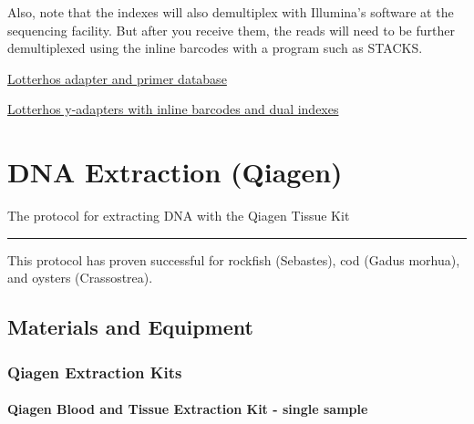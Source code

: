 \documentclass[
  letterpaper,
  DIV=11,
  numbers=noendperiod]{scrreprt}
\begin{document}
Also, note that the indexes will also demultiplex with Illumina's
software at the sequencing facility. But after you receive them, the
reads will need to be further demultiplexed using the inline barcodes
with a program such as STACKS.

\href{https://docs.google.com/spreadsheets/d/1bro9DbuJB9zH8KtIUH3H7FHrlVO2gZYbIsUbx7yax70/edit\#gid=0}{Lotterhos
adapter and primer database}

\href{https://docs.google.com/spreadsheets/d/1Ok9EEkloK6RCCpKsc4tjklF4UygO8SnATWK8HGLgpvY/edit\#gid=0}{Lotterhos
y-adapters with inline barcodes and dual indexes}

\hypertarget{dna-extraction-qiagen}{%
\chapter{DNA Extraction (Qiagen)}\label{dna-extraction-qiagen}}

The protocol for extracting DNA with the Qiagen Tissue Kit

\begin{center}\rule{0.5\linewidth}{0.5pt}\end{center}

This protocol has proven successful for rockfish (Sebastes), cod (Gadus
morhua), and oysters (Crassostrea).

\hypertarget{materials-and-equipment}{%
\section*{\texorpdfstring{\textbf{Materials and
Equipment}}{Materials and Equipment}}\label{materials-and-equipment}}


\hypertarget{qiagen-extraction-kits}{%
\subsection*{\texorpdfstring{\textbf{Qiagen Extraction
Kits}}{Qiagen Extraction Kits}}\label{qiagen-extraction-kits}}

\hypertarget{qiagen-blood-and-tissue-extraction-kit---single-sample}{%
\subsubsection*{\texorpdfstring{\textbf{Qiagen Blood and Tissue
Extraction Kit - single
sample}}{Qiagen Blood and Tissue Extraction Kit - single sample}}\label{qiagen-blood-and-tissue-extraction-kit---single-sample}}
\end{document}
